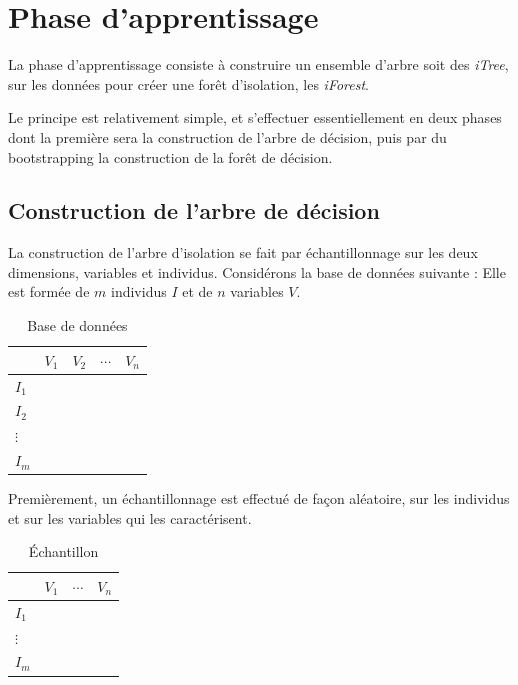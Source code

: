 \section{Phase d'apprentissage}

La phase d'apprentissage consiste à construire un ensemble d'arbre soit des \emph{iTree}, sur les données pour créer une forêt d'isolation, les \emph{iForest}.

Le principe est relativement simple, et s'effectuer essentiellement en deux phases dont la première sera la construction de l'arbre de décision, puis par du bootstrapping la construction de la forêt de décision.

\subsection*{Construction de l'arbre de décision}

La construction de l'arbre d'isolation se fait par échantillonnage sur les deux dimensions, variables et individus.
Considérons la base de données  suivante :
Elle est formée de $m$ individus $I$ et de $n$ variables $V$.

\begin{table}[H]
\centering
\caption{Base de données}
\label{bdd}
\begin{tabular}{|l|l|l|l|l|}
\hline
 & $V_1$ & $V_2$ & $\cdots$ & $V_n$ \\ \hline
$I_1$ &  &  &  &  \\ \hline
$I_2$ &  &  &  &  \\ \hline
$\vdots$ &  &  &  &  \\ \hline
$I_m$ &  &  &  &  \\ \hline
\end{tabular}
\end{table}

Premièrement, un échantillonnage est effectué de façon aléatoire, sur les individus et sur les variables qui les caractérisent.

\begin{table}[H]
\centering
\caption{Échantillon}
\label{ech}
\begin{tabular}{|l|l|l|l|}
\hline
 & $V_1$ &  $\cdots$ & $V_n$ \\ \hline
$I_1$ &  &  &  \\ \hline
$\vdots$ &  &  &  \\ \hline
$I_m$ &  &  &  \\ \hline
\end{tabular}
\end{table}

